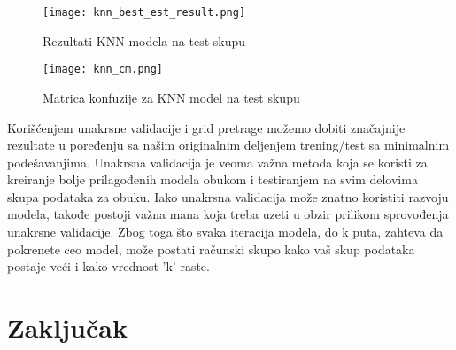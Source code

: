 \documentclass[a4paper,12pt]{article}
\begin{document}
\begin{figure}[h!]
\centering
\texttt{[image: knn\_best\_est\_result.png]}
\caption{Rezultati KNN modela na test skupu}
\label{fig:knn_best_est_result}
\end{figure}

\begin{figure}[h!]
\centering
\texttt{[image: knn\_cm.png]}
\caption{Matrica konfuzije za KNN model na test skupu}
\label{fig:knn_cm}
\end{figure}

Korišćenjem unakrsne validacije i grid pretrage možemo dobiti značajnije rezultate u poređenju sa našim originalnim deljenjem trening/test sa minimalnim podešavanjima. Unakrsna validacija je veoma važna metoda koja se koristi za kreiranje bolje prilagođenih modela obukom i testiranjem na svim delovima skupa podataka za obuku.
Iako unakrsna validacija može znatno koristiti razvoju modela, takođe postoji važna mana koja treba uzeti u obzir prilikom sprovođenja unakrsne validacije. Zbog toga što svaka iteracija modela, do k puta, zahteva da pokrenete ceo model, može postati računski skupo kako vaš skup podataka postaje veći i kako vrednost 'k' raste.

\section{Zaključak}


\begin{thebibliography}{9}
\end{thebibliography}
\end{document}
